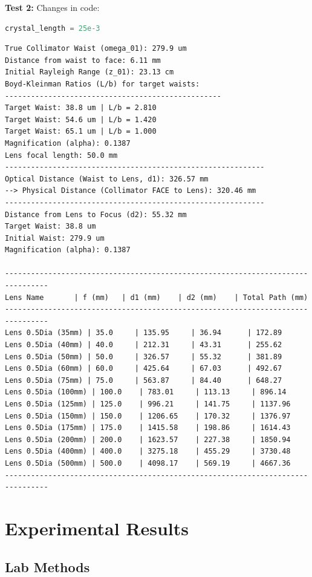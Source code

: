 \documentclass[11pt, letterpaper]{article}
\begin{document}
\textbf{Test 2:}
Changes in code:
\begin{lstlisting}[language=Python]
crystal_length = 25e-3
\end{lstlisting}
\begin{verbatim}
True Collimator Waist (omega_01): 279.9 um
Distance from waist to face: 6.11 mm
Initial Rayleigh Range (z_01): 23.13 cm
Boyd-Kleinman Ratios (L/b) for target waists:
--------------------------------------------------
Target Waist: 38.8 um | L/b = 2.810
Target Waist: 54.6 um | L/b = 1.420
Target Waist: 65.1 um | L/b = 1.000
Magnification (alpha): 0.1387
Lens focal length: 50.0 mm
------------------------------------------------------------
Optical Distance (Waist to Lens, d1): 326.57 mm
--> Physical Distance (Collimator FACE to Lens): 320.46 mm
------------------------------------------------------------
Distance from Lens to Focus (d2): 55.32 mm
Target Waist: 38.8 um
Initial Waist: 279.9 um
Magnification (alpha): 0.1387

--------------------------------------------------------------------------------
Lens Name       | f (mm)   | d1 (mm)    | d2 (mm)    | Total Path (mm)
--------------------------------------------------------------------------------
Lens 0.5Dia (35mm) | 35.0     | 135.95     | 36.94      | 172.89         
Lens 0.5Dia (40mm) | 40.0     | 212.31     | 43.31      | 255.62         
Lens 0.5Dia (50mm) | 50.0     | 326.57     | 55.32      | 381.89         
Lens 0.5Dia (60mm) | 60.0     | 425.64     | 67.03      | 492.67         
Lens 0.5Dia (75mm) | 75.0     | 563.87     | 84.40      | 648.27         
Lens 0.5Dia (100mm) | 100.0    | 783.01     | 113.13     | 896.14         
Lens 0.5Dia (125mm) | 125.0    | 996.21     | 141.75     | 1137.96        
Lens 0.5Dia (150mm) | 150.0    | 1206.65    | 170.32     | 1376.97        
Lens 0.5Dia (175mm) | 175.0    | 1415.58    | 198.86     | 1614.43        
Lens 0.5Dia (200mm) | 200.0    | 1623.57    | 227.38     | 1850.94        
Lens 0.5Dia (400mm) | 400.0    | 3275.18    | 455.29     | 3730.48        
Lens 0.5Dia (500mm) | 500.0    | 4098.17    | 569.19     | 4667.36        
--------------------------------------------------------------------------------
\end{verbatim}

\newpage
\section{Experimental Results}
\subsection{Lab Methods}
\end{document}
